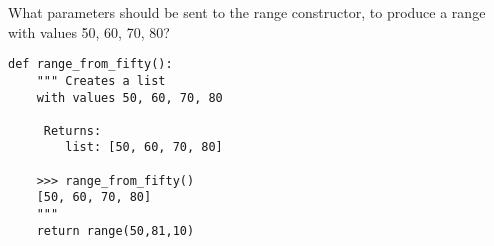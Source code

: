  \label{sssec:ex1_9}

What parameters should be sent to the range constructor, to produce a
range with values 50, 60, 70, 80?

\begin{lstlisting}[title=Exercise R-1.9]
def range_from_fifty():
    """ Creates a list
    with values 50, 60, 70, 80

     Returns:
        list: [50, 60, 70, 80]

    >>> range_from_fifty()
    [50, 60, 70, 80]
    """
    return range(50,81,10)
\end{lstlisting}